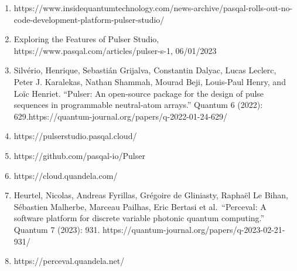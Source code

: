 \documentclass[a4paper,12pt
]{article}
\providecommand{\tightlist}{%
  \setlength{\itemsep}{0pt}\setlength{\parskip}{0pt}}
\begin{document}
\begin{enumerate}
\def\labelenumi{\arabic{enumi}.}
\tightlist
\item
  https://www.insidequantumtechnology.com/news-archive/pasqal-rolls-out-no-code-development-platform-pulser-studio/
\item
  Exploring the Features of Pulser Studio,
  https://www.pasqal.com/articles/pulser-s-1, 06/01/2023
\item
  Silvério, Henrique, Sebastián Grijalva, Constantin Dalyac, Lucas
  Leclerc, Peter J. Karalekas, Nathan Shammah, Mourad Beji, Louis-Paul
  Henry, and Loïc Henriet. ``Pulser: An open-source package for the
  design of pulse sequences in programmable neutral-atom arrays.''
  Quantum 6 (2022):
  629.https://quantum-journal.org/papers/q-2022-01-24-629/
\item
  https://pulserstudio.pasqal.cloud/
\item
  https://github.com/pasqal-io/Pulser
\item
  https://cloud.quandela.com/
\item
  Heurtel, Nicolas, Andreas Fyrillas, Grégoire de Gliniasty, Raphaël Le
  Bihan, Sébastien Malherbe, Marceau Pailhas, Eric Bertasi et
  al.~``Perceval: A software platform for discrete variable photonic
  quantum computing.'' Quantum 7 (2023): 931.
  https://quantum-journal.org/papers/q-2023-02-21-931/
\item
  https://perceval.quandela.net/
\end{enumerate}
\end{document}
